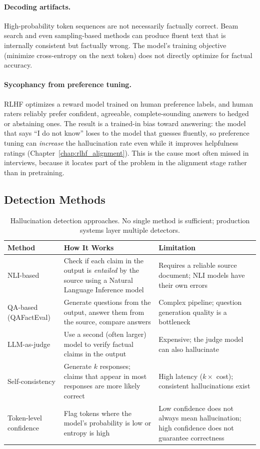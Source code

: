 \paragraph{Decoding artifacts.}
High-probability token sequences are not necessarily factually correct.
Beam search and even sampling-based methods can produce fluent text that
is internally consistent but factually wrong.  The model's training
objective (minimize cross-entropy on the next token) does not directly
optimize for factual accuracy.

\paragraph{Sycophancy from preference tuning.}
RLHF optimizes a reward model trained on human preference labels, and human
raters reliably prefer confident, agreeable, complete-sounding answers to
hedged or abstaining ones.  The result is a trained-in bias toward answering:
the model that says ``I do not know'' loses to the model that guesses fluently,
so preference tuning can \emph{increase} the hallucination rate even while it
improves helpfulness ratings (Chapter~\ref{chap:rlhf_alignment}).  This is the
cause most often missed in interviews, because it locates part of the problem
in the alignment stage rather than in pretraining.

\subsection{Detection Methods}

\begin{table}[H]
\centering
\caption{Hallucination detection approaches.  No single method is sufficient;
production systems layer multiple detectors.}
\label{tab:hallucination_detection}
\begin{tabularx}{\textwidth}{l X l}
\toprule
\textbf{Method} & \textbf{How It Works} & \textbf{Limitation} \\
\midrule
NLI-based & Check if each claim in the output is \emph{entailed} by the source
    using a Natural Language Inference model & Requires a reliable source
    document; NLI models have their own errors \\
QA-based (QAFactEval) & Generate questions from the output, answer them from
    the source, compare answers & Complex pipeline; question generation
    quality is a bottleneck \\
LLM-as-judge & Use a second (often larger) model to verify factual claims
    in the output & Expensive; the judge model can also hallucinate \\
Self-consistency & Generate $k$ responses; claims that appear in most
    responses are more likely correct & High latency ($k\times$ cost);
    consistent hallucinations exist \\
Token-level confidence & Flag tokens where the model's probability is low
    or entropy is high & Low confidence does not always mean hallucination;
    high confidence does not guarantee correctness \\
\bottomrule
\end{tabularx}
\end{table}


